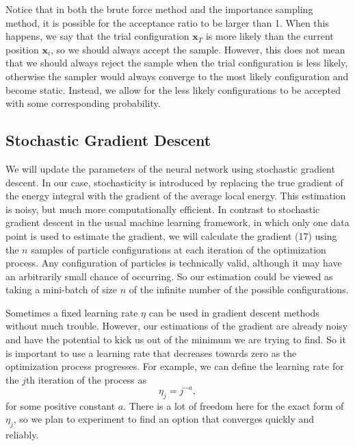 \documentclass[prb,aps,twocolumn,showpacs,10pt]{revtex4-1}
\begin{document}
Notice that in both the brute force method and the importance sampling method, it is possible for the acceptance ratio to be larger than 1. When this happens, we say that the trial configuration $\bm{x}_T$ is more likely than the current position $\bm{x}_i$, so we should always accept the sample. However, this does not mean that we should always reject the sample when the trial configuration is less likely, otherwise the sampler would always converge to the most likely configuration and become static. Instead, we allow for the less likely configurations to be accepted with some corresponding probability. 


\subsection{Stochastic Gradient Descent}

We will update the parameters of the neural network using stochastic gradient descent. In our case, stochasticity is introduced by replacing the true gradient of the energy integral with the gradient of the average local energy. This estimation is noisy, but much more computationally efficient. In contrast to stochastic gradient descent in the usual machine learning framework, in which only one data point is used to estimate the gradient, we will calculate the gradient (17) using the $n$ samples of particle configurations at each iteration of the optimization process. Any configuration of particles is technically valid, although it may have an arbitrarily small chance of occurring. So our estimation could be viewed as taking a mini-batch of size $n$ of the infinite number of the possible configurations.

Sometimes a fixed learning rate $\eta$ can be used in gradient descent methods without much trouble. However, our estimations of the gradient are already noisy and have the potential to kick us out of the minimum we are trying to find. So it is important to use a learning rate that decreases towards zero as the optimization process progresses. For example, we can define the learning rate for the $j$th iteration of the process as
\begin{equation}
\eta_j = j^{-a},
\end{equation}
for some positive constant $a$. There is a lot of freedom here for the exact form of $\eta_j$, so we plan to experiment to find an option that converges quickly and reliably. 
\end{document}
